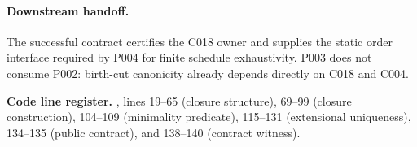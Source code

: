 \paragraph*{Downstream handoff.}
The successful contract certifies the C018 owner and supplies the static order
interface required by P004 for finite schedule exhaustivity.  P003 does not
consume P002: birth-cut canonicity already depends directly on C018 and C004.

\noindent\textbf{Code line register.}
, lines 19--65 (closure structure), 69--99 (closure
construction), 104--109 (minimality predicate), 115--131 (extensional
uniqueness), 134--135 (public contract), and 138--140 (contract witness).
